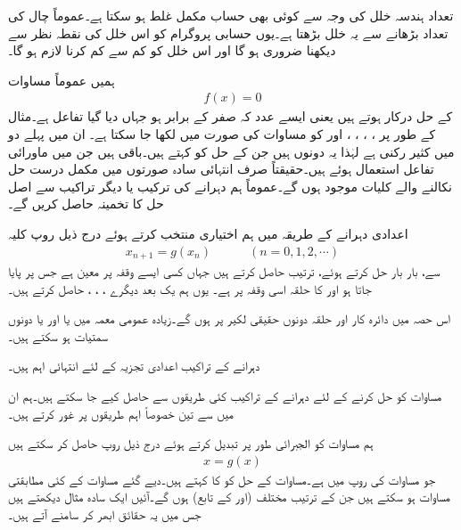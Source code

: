 تعداد ہندسہ خلل کی وجہ سے کوئی بھی حساب مکمل غلط ہو سکتا ہے۔عموماً چال کی تعداد بڑھانے سے یہ خلل بڑھتا ہے۔یوں حسابی پروگرام کو اس خلل کی نقطہ نظر سے دیکھنا ضروری ہو گا اور اس خلل کو کم سے کم کرنا لازم ہو گا۔

ہمیں عموماً مساوات 
\begin{align}\label{مساوات_اعدادی_تفاعل_الف}
f(x)=0
\end{align}
کے حل درکار ہوتے ہیں یعنی ایسے عدد  کہ  صفر کے برابر ہو جہاں  دیا گیا تفاعل ہے۔مثال کے طور پر ، ، ، ،  اور  کو مساوات  کی صورت میں لکھا جا سکتا ہے۔ ان میں پہلے دو میں  کثیر رکنی ہے لہٰذا یہ دونوں  ہیں جن کے حل کو  کہتے ہیں۔باقی  ہیں جن میں ماورائی تفاعل استعمال ہوئے ہیں۔حقیقتاً صرف انتہائی سادہ صورتوں میں مکمل درست حل نکالنے والے کلیات موجود ہوں گے۔عموماً ہم دہرانے کی ترکیب یا دیگر تراکیب سے اصل حل کا تخمینہ حاصل کریں گے۔

اعدادی دہرانے کے طریقہ میں ہم اختیاری  منتخب کرتے ہوئے  درج ذیل روپ کلیہ
\begin{align}\label{مساوات_اعدادی_تفاعل_ب}
x_{n+1}=g(x_n)\quad \quad \quad (n=0,1,2,\cdots)
\end{align}
سے، بار بار حل کرتے ہوئے، ترتیب  حاصل کرتے ہیں جہاں  کسی ایسے وقفہ پر معین ہے جس پر  پایا جاتا ہو اور   کا حلقہ اسی وقفہ پر ہے۔ یوں ہم یک بعد دیگرے ،  ، ،  حاصل کرتے ہیں۔

اس حصہ میں دائرہ کار اور حلقہ  دونوں حقیقی لکیر پر ہوں گے۔زیادہ عمومی معمہ میں  یا  اور یا دونوں سمتیات ہو سکتے ہیں۔

دہرانے کے تراکیب اعدادی تجزیہ کے لئے انتہائی اہم ہیں۔

مساوات  کو حل کرنے کے لئے  دہرانے کے تراکیب کئی طریقوں سے حاصل کیے جا سکتے ہیں۔ہم ان میں سے تین خصوصاً اہم طریقوں پر غور کرتے ہیں۔

 ہم مساوات  کو الجبرائی طور پر تبدیل کرتے ہوئے درج ذیل روپ حاصل کر سکتے ہیں
\begin{align}\label{مساوات_اعدادی_تفاعل_پ}
x=g(x)
\end{align}
جو مساوات   کی روپ میں ہے۔مساوات  کے حل کو  کا  کہتے ہیں۔دیے گئے مساوات  کے کئی مطابقتی مساوات  ہو سکتے ہیں جن کے ترتیب  مختلف (اور  کے تابع) ہوں گے۔آئیں ایک سادہ مثال دیکھتے ہیں جس میں یہ حقائق ابھر کر سامنے آتے ہیں۔

